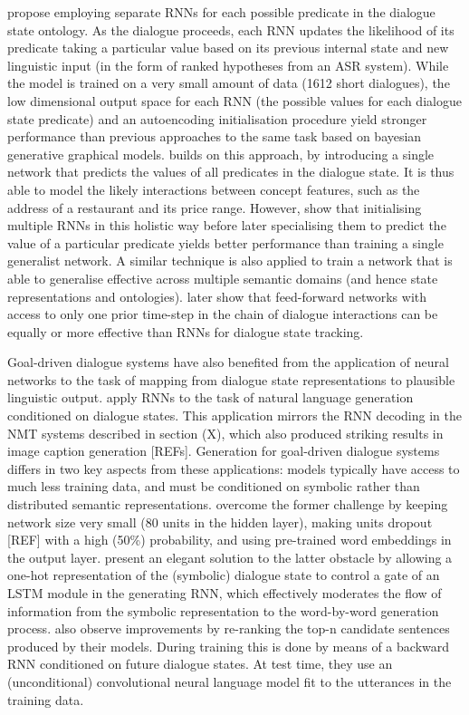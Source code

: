 \documentclass[11pt,letterpaper]{article}
\begin{document}
 propose employing separate RNNs for each possible predicate in the dialogue state ontology. As the dialogue proceeds, each RNN updates the likelihood of its predicate taking a particular value based on its previous internal state and new linguistic input (in the form of ranked hypotheses from an ASR system). While the model is trained on a very small amount of data (1612 short dialogues), the low dimensional output space for each RNN (the possible values for each dialogue state predicate) and an autoencoding initialisation procedure yield stronger performance than previous approaches to the same task based on bayesian generative graphical models.  builds on this approach, by introducing a single network that predicts the values of all predicates in the dialogue state. It is thus able to model the likely interactions between concept features, such as the address of a restaurant and its price range. However,  show that initialising multiple RNNs in this holistic way before later specialising them to predict the value of a particular predicate yields better performance than training a single generalist network. A similar technique is also applied to train a network that is able to generalise effective across multiple semantic domains (and hence state representations and ontologies).  later show that feed-forward networks with access to only one prior time-step in the chain of dialogue interactions can be equally or more effective than RNNs for dialogue state tracking. 

Goal-driven dialogue systems have also benefited from the application of neural networks to the task of mapping from dialogue state representations to plausible linguistic output.  apply RNNs to the task of natural language generation conditioned on dialogue states. This application mirrors the RNN decoding in the NMT systems described in section (X), which also produced striking results in image caption generation [REFs]. Generation for goal-driven dialogue systems differs in two key aspects from these applications: models typically have access to much less training data, and must be conditioned on symbolic rather than distributed semantic representations.  overcome the former challenge by keeping network size very small (80 units in the hidden layer), making units dropout [REF] with a high (50\%) probability, and using pre-trained word embeddings in the output layer.  present an elegant solution to the latter obstacle by allowing a one-hot representation of the (symbolic) dialogue state to control a gate of an LSTM module in the generating RNN, which effectively moderates the flow of information from the symbolic representation to the word-by-word generation process.  also observe improvements by re-ranking the top-n candidate sentences produced by their models. During training this is done by means of a backward RNN conditioned on future dialogue states. At test time, they use an (unconditional) convolutional neural language model fit to the utterances in the training data. 
\end{document}
